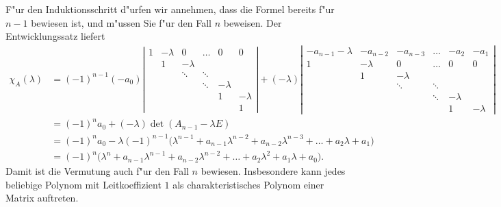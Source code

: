 \begin{loesung}
F"ur den Induktionsschritt d"urfen wir annehmen, dass die Formel bereits
f"ur $n-1$ bewiesen ist, und m"ussen Sie f"ur den Fall $n$ beweisen.
Der Entwicklungssatz liefert
\begin{align*}
\chi_A(\lambda)
&=
(-1)^{n-1}(-a_0)\left|\begin{matrix}
   1            &-\lambda&   0    &\dots &   0    &   0    \\
                &   1    &-\lambda&      &        &        \\
                &        &\ddots  &\ddots&        &        \\
                &        &        &\ddots&-\lambda&        \\
                &        &        &      &   1    &-\lambda\\
                &        &        &      &        &   1    
\end{matrix}\right|
+(-\lambda)\left|\begin{matrix}
-a_{n-1}-\lambda&-a_{n-2}&-a_{n-3}&\dots & -a_2   & -a_1   \\
   1            &-\lambda&   0    &\dots &   0    &   0    \\
                &   1    &-\lambda&      &        &        \\
                &        &\ddots  &\ddots&        &        \\
                &        &        &\ddots&-\lambda&        \\
                &        &        &      &   1    &-\lambda
\end{matrix}\right|
\\
&=(-1)^n a_0 + (-\lambda)\det(A_{n-1}-\lambda E)
\\
&=(-1)^n a_0 -\lambda (-1)^{n-1}
\bigl(
\lambda^{n-1}+a_{n-1}\lambda^{n-2}+a_{n-2}\lambda^{n-3}+\dots+a_2\lambda+a_1
\bigr)
\\
&=(-1)^n\bigl(
\lambda^n+a_{n-1}\lambda^{n-1}+a_{n-2}\lambda^{n-2}+\dots+a_2\lambda^2+a_1\lambda+a_0
\bigr).
\end{align*}
Damit ist die Vermutung auch f"ur den Fall $n$ bewiesen.
Insbesondere kann jedes beliebige Polynom mit Leitkoeffizient $1$
als charakteristisches Polynom einer Matrix auftreten.
\end{loesung}

